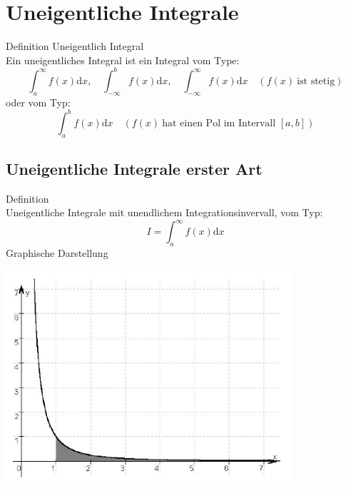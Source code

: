 \section{Uneigentliche Integrale}
\begin{definition}{Definition Uneigentlich Integral}\\
	Ein uneigentliches Integral ist ein Integral vom Type:
	\[\int_a^\infty{f(x)\mathrm{d}x}, \quad \int_{-\infty}^b{f(x)\mathrm{d}x}, \quad
	\int_{-\infty}^{\infty}{f(x)\mathrm{d}x} \quad (f(x) \: \text{ist stetig}) \]
	oder vom Typ:
	\[\int_a^b{f(x)\mathrm{d}x} \quad (f(x)\:\text{hat einen Pol im Intervall }[a,b]) \]
\end{definition}
\subsection{Uneigentliche Integrale erster Art}
\begin{definition}{Definition}\\
	Uneigentliche Integrale mit unendlichem Integrationsinvervall, vom Typ:
	\[I=\int_a^{\infty}{f(x)\mathrm{d}x} \]
Graphische Darstellung
  \begin{centering}
	  \includegraphics[width=0.8\textwidth]{images/Uneigentlicher_Integral_Beispiel1.png}\\
  \end{centering}
\end{definition}
